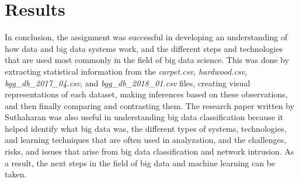 \documentclass[a4paper,12pt]{IEEEtran}
\begin{document}
\section{Results}
In conclusion, the assignment was successful in developing an understanding of how data and big data systems work, and the different steps and technologies that are used most commonly in the field of big data science. This was done by extracting statistical information from the \textit{carpet.csv, hardwood.csv, bgg\_db\_2017\_04.csv}, and \textit{bgg\_db\_2018\_01.csv} files, creating visual representations of each dataset, making inferences based on these observations, and then finally comparing and contrasting them. The research paper written by Suthaharan was also useful in understanding big data classification because it helped identify what big data was, the different types of systems, technologies, and learning techniques that are often used in analyzation, and the challenges, risks, and issues that arise from big data classification and network intrusion. As a result, the next steps in the field of big data and machine learning can be taken.
\end{document}
